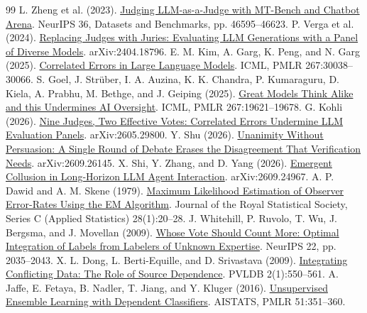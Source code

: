 \documentclass[11pt,letterpaper]{article}
\begin{document}
\clearpage
\begingroup
\small
\setlength{\parskip}{0pt}
\begin{thebibliography}{99}
\setlength{\itemsep}{2.5pt}
 L. Zheng et al. (2023). \href{https://proceedings.neurips.cc/paper_files/paper/2023/hash/91f18a1287b398d378ef22505bf41832-Abstract.html}{Judging LLM-as-a-Judge with MT-Bench and Chatbot Arena}. NeurIPS 36, Datasets and Benchmarks, pp. 46595--46623.
 P. Verga et al. (2024). \href{https://arxiv.org/abs/2404.18796}{Replacing Judges with Juries: Evaluating LLM Generations with a Panel of Diverse Models}. arXiv:2404.18796.
 E. M. Kim, A. Garg, K. Peng, and N. Garg (2025). \href{https://proceedings.mlr.press/v267/kim25e.html}{Correlated Errors in Large Language Models}. ICML, PMLR 267:30038--30066.
 S. Goel, J. Str\"uber, I. A. Auzina, K. K. Chandra, P. Kumaraguru, D. Kiela, A. Prabhu, M. Bethge, and J. Geiping (2025). \href{https://proceedings.mlr.press/v267/goel25b.html}{Great Models Think Alike and this Undermines AI Oversight}. ICML, PMLR 267:19621--19678.
 G. Kohli (2026). \href{https://arxiv.org/abs/2605.29800}{Nine Judges, Two Effective Votes: Correlated Errors Undermine LLM Evaluation Panels}. arXiv:2605.29800.
 Y. Shu (2026). \href{https://arxiv.org/abs/2609.26145}{Unanimity Without Persuasion: A Single Round of Debate Erases the Disagreement That Verification Needs}. arXiv:2609.26145.
 X. Shi, Y. Zhang, and D. Yang (2026). \href{https://arxiv.org/abs/2609.24967}{Emergent Collusion in Long-Horizon LLM Agent Interaction}. arXiv:2609.24967.
 A. P. Dawid and A. M. Skene (1979). \href{https://doi.org/10.2307/2346806}{Maximum Likelihood Estimation of Observer Error-Rates Using the EM Algorithm}. Journal of the Royal Statistical Society, Series C (Applied Statistics) 28(1):20--28.
 J. Whitehill, P. Ruvolo, T. Wu, J. Bergsma, and J. Movellan (2009). \href{https://proceedings.neurips.cc/paper/2009/hash/f899139df5e1059396431415e770c6dd-Abstract.html}{Whose Vote Should Count More: Optimal Integration of Labels from Labelers of Unknown Expertise}. NeurIPS 22, pp. 2035--2043.
 X. L. Dong, L. Berti-Equille, and D. Srivastava (2009). \href{https://doi.org/10.14778/1687627.1687689}{Integrating Conflicting Data: The Role of Source Dependence}. PVLDB 2(1):550--561.
 A. Jaffe, E. Fetaya, B. Nadler, T. Jiang, and Y. Kluger (2016). \href{https://proceedings.mlr.press/v51/jaffe16.html}{Unsupervised Ensemble Learning with Dependent Classifiers}. AISTATS, PMLR 51:351--360.

\end{thebibliography}
\end{document}
